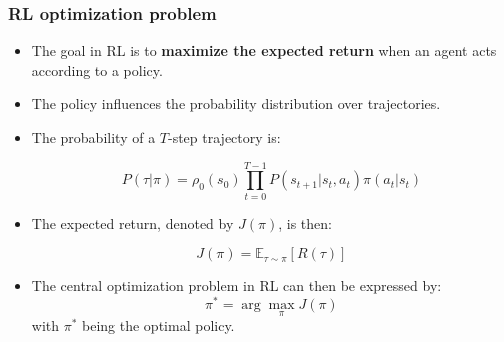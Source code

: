 \documentclass[9pt]{beamer}
\newcommand{\E}{{\mathbb E}}
\begin{document}



\begin{frame}

	\frametitle{RL optimization problem}

		\begin{itemize}
			\item The goal in RL is to \textbf{maximize the expected return} when an agent acts according to a policy.
			\item The policy influences the probability distribution over trajectories.
		\item The probability of a $T$-step trajectory is:

			\begin{equation}
				P(\tau|\pi) = \rho_0 (s_0) \prod_{t=0}^{T-1} P(s_{t+1} | s_t, a_t) \pi(a_t | s_t)
			\end{equation}
		
		
		\item The expected return, denoted by $J(\pi)$, is then:

			\begin{equation}
			J(\pi) = \E_{\tau\sim \pi}{[R(\tau)]}
			\label{eq:loss}
			\end{equation}

		\item The central optimization problem in RL can then be expressed by:
			\begin{equation}
			\pi^* = \arg \max_{\pi} J(\pi)
			\label{eq:max_loss}
			\end{equation}
				with $\pi^*$ being the optimal policy.
		\end{itemize}
		
\end{frame}

\end{document}
